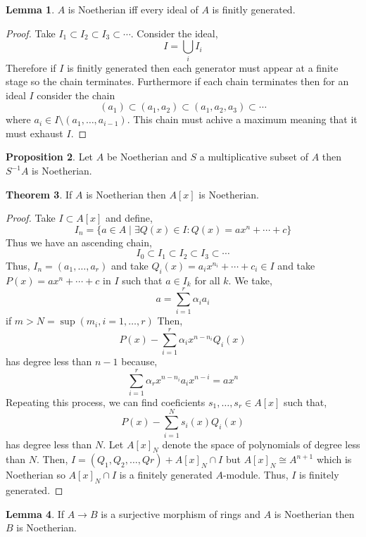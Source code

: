 \documentclass[12pt]{article}
\theoremstyle{remark}
\theoremstyle{definition}
\newtheorem{theorem}{Theorem}[section]
\newtheorem{lemma}[theorem]{Lemma}
\newtheorem{proposition}[theorem]{Proposition}
\begin{document}
\begin{lemma}
$A$ is Noetherian iff every ideal of $A$ is finitly generated.
\end{lemma}

\begin{proof}
Take $I_1 \subset I_2 \subset I_3 \subset \cdots $. 
Consider the ideal,
\[ I = \bigcup_i I_i \]
Therefore if $I$ is finitly generated then each generator must appear at a finite stage so the chain terminates. Furthermore if each chain terminates then for an ideal $I$ consider the chain
\[ (a_1) \subset (a_1, a_2) \subset(a_1, a_2, a_3) \subset \cdots \]
where $a_i \in I \setminus (a_1, \dots, a_{i-1})$. This chain must achive a maximum meaning that it must exhaust $I$. 
\end{proof}

\begin{proposition}
Let $A$ be Noetherian and $S$ a multiplicative subset of $A$ then $S^{-1}A$ is Noetherian. 
\end{proposition}

\begin{theorem}
If $A$ is Noetherian then $A[x]$ is Noetherian.
\end{theorem}

\begin{proof}
Take $I \subset A[x]$ and define,
\[ I_n = \{ a \in A \mid \exists Q(x) \in I : Q(x) = a x^n + \cdots + c \} \]
Thus we have an ascending chain,
\[ I_0 \subset I_1 \subset I_2 \subset I_3 \subset \cdots \]
Thus, $I_n = (a_1, \dots, a_r)$ and take $Q_i(x) = a_i x^{n_i} + \cdots + c_i \in I$ and take $P(x) = a x^n + \cdots + c$ in $I$ such that $a \in I_k$ for all $k$. We take,
\[ a = \sum_{i = 1}^r \alpha_i a_i \]
if $m > N = \sup{(m_i, i = 1, \dots, r)}$ 
Then,
\[ P(x) - \sum_{i = 1}^r \alpha_i x^{n - n_i} Q_i(x) \]
has degree less than $n - 1$ because,
\[ \sum_{i = 1}^r \alpha_r x^{n - n_i} a_i x^{n-i} = a x^n \]
Repeating this process, we can find coeficients $s_1, \dots, s_r \in A[x]$ such that,
\[ P(x) - \sum_{i = 1}^N s_i(x) Q_i(x) \]
has degree less than $N$. Let $A[x]_N$ denote the space of polynomials of degree less than $N$. 
Then, $I = (Q_1, Q_2, \dots, Qr) + A[x]_N \cap I$ but $A[x]_N \cong A^{n+1}$ which is Noetherian so $A[x]_N \cap I$ is a finitely generated $A$-module. Thus, $I$ is finitely generated. 
\end{proof}

\begin{lemma}
If $A \to B$ is a surjective morphism of rings and $A$ is Noetherian then $B$ is Noetherian. 
\end{lemma}
\end{document}
